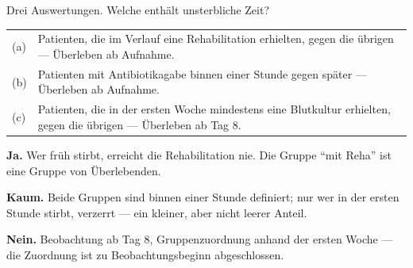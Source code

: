 \begin{aufgabe}
Drei Auswertungen. Welche enthält unsterbliche Zeit?

\begin{center}
{\small
\renewcommand{\arraystretch}{1.5}
\begin{tabular}{@{}P{1.0cm}P{7.4cm}@{}}
\toprule
(a) & Patienten, die im Verlauf eine Rehabilitation erhielten, gegen die übrigen --- Überleben ab Aufnahme.\\
(b) & Patienten mit Antibiotikagabe binnen einer Stunde gegen später --- Überleben ab Aufnahme.\\
(c) & Patienten, die in der ersten Woche mindestens eine Blutkultur erhielten, gegen die übrigen --- Überleben ab Tag 8.\\
\bottomrule
\end{tabular}}
\end{center}

\loesung
{}
\begin{center}
\begin{minipage}{0.9\textwidth}
\textbf{Ja.} Wer früh stirbt, erreicht die Rehabilitation nie. Die Gruppe \enquote{mit Reha} ist eine Gruppe von Überlebenden.
\end{minipage}
\end{center}

\begin{center}
\begin{minipage}{0.9\textwidth}
\textbf{Kaum.} Beide Gruppen sind binnen einer Stunde definiert; nur wer in der ersten Stunde stirbt, verzerrt --- ein kleiner, aber nicht leerer Anteil.
\end{minipage}
\end{center}


\begin{center}
\begin{minipage}{0.9\textwidth}
\textbf{Nein.} Beobachtung ab Tag 8, Gruppenzuordnung anhand der ersten Woche --- die Zuordnung ist zu Beobachtungsbeginn abgeschlossen.
\end{minipage}
\end{center}

\begin{center}
\begin{minipage}{0.88\textwidth}
\end{minipage}
\end{center}
\end{aufgabe}

